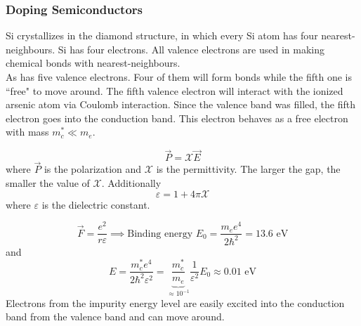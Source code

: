 \documentclass[12pt,a4paper,titlepage]{article}
\newcommand{\trm}[1]{\textrm{#1}} %
\newcommand{\Chi}{\mathcal{X}} %
\begin{document}
\subsubsection*{Doping Semiconductors}
Si crystallizes in the diamond structure, in which every Si atom has four nearest-neighbours. Si has four electrons. All valence electrons are used in making chemical bonds with nearest-neighbours.\\

As has five valence electrons. Four of them will form bonds while the fifth one is ``free" to move around. The fifth valence electron will interact with the ionized arsenic atom via Coulomb interaction. Since the valence band was filled, the fifth electron goes into the conduction band. This electron behaves as a free electron with mass $m_{c}^{*}\ll m_{e}$.
\begin{center}
\end{center}
\begin{equation}
\vec{P}=\Chi\vec{E}
\end{equation}
where $\vec{P}$ is the polarization and $\Chi$ is the permittivity. The larger the gap, the smaller the value of $\Chi$. Additionally
\begin{equation}
\varepsilon = 1+4\pi\Chi
\end{equation}
where $\varepsilon$ is the dielectric constant.

\begin{equation}
\vec{F}=\frac{e^{2}}{r\varepsilon}\implies\trm{Binding energy }E_{0}=\frac{m_{e}e^{4}}{2\hbar^{2}}=13.6\trm{ eV}
\end{equation}
and
\begin{equation}
E=\frac{m_{c}^{*}e^{4}}{2\hbar^{2}\varepsilon^{2}}=\underbrace{\frac{m_{c}^{*}}{m_{e}}}_{\approx10^{-1}}\frac{1}{\varepsilon^{2}}E_{0}\approx 0.01\trm{ eV}
\end{equation}
Electrons from the impurity energy level are easily excited into the conduction band from the valence band and can move around.
\end{document}
